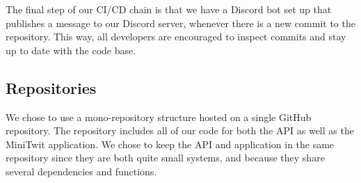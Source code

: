 \begin{itemize}
\begin{itemize}
    \end{itemize}    
\end{itemize}

The final step of our CI/CD chain is that we have a Discord bot set up that publishes a message to our Discord server, whenever there is a new commit to the repository. This way, all developers are encouraged to inspect commits and stay up to date with the code base.

\subsection{Repositories}
We chose to use a mono-repository structure hosted on a single GitHub repository. The repository  includes all of our code for both the API as well as the MiniTwit application. 
We chose to keep the API and application in the same repository since they are both quite small systems, and because they share several dependencies and functions.


